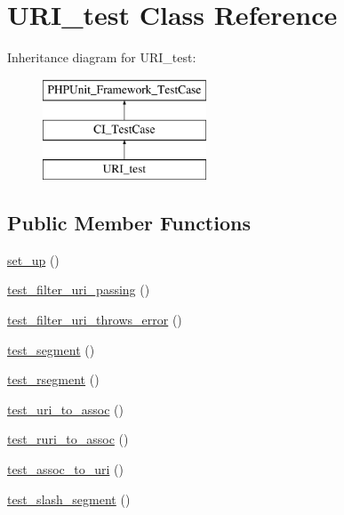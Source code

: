 \hypertarget{class_u_r_i__test}{}\section{U\+R\+I\+\_\+test Class Reference}
\label{class_u_r_i__test}
Inheritance diagram for U\+R\+I\+\_\+test\+:\begin{figure}[H]
\begin{center}
\leavevmode
\includegraphics[height=3.000000cm]{class_u_r_i__test}
\end{center}
\end{figure}
\subsection*{Public Member Functions}
\begin{DoxyCompactItemize}
\item 
\hyperlink{class_u_r_i__test_a69829875c8d4b6ce94908445c4155741}{set\+\_\+up} ()
\item 
\hyperlink{class_u_r_i__test_a8da16043d02a8e50efa3b54f88b3a51a}{test\+\_\+filter\+\_\+uri\+\_\+passing} ()
\item 
\hyperlink{class_u_r_i__test_a98c96eee901d15e8e781aacea4c1a561}{test\+\_\+filter\+\_\+uri\+\_\+throws\+\_\+error} ()
\item 
\hyperlink{class_u_r_i__test_a474a25a65fed8ee6efde500a89d79198}{test\+\_\+segment} ()
\item 
\hyperlink{class_u_r_i__test_ade24caa3e9af54c641a71a4db9158d9d}{test\+\_\+rsegment} ()
\item 
\hyperlink{class_u_r_i__test_aa6cec1283d60146f8f21ae90fc29b62e}{test\+\_\+uri\+\_\+to\+\_\+assoc} ()
\item 
\hyperlink{class_u_r_i__test_a026dcb7e27bfbae03836e5816b045c81}{test\+\_\+ruri\+\_\+to\+\_\+assoc} ()
\item 
\hyperlink{class_u_r_i__test_acb8f712372131c754582bd43164cd306}{test\+\_\+assoc\+\_\+to\+\_\+uri} ()
\item 
\hyperlink{class_u_r_i__test_a23b3d5c1449504d92d40b15737015bf8}{test\+\_\+slash\+\_\+segment} ()
\end{DoxyCompactItemize}

